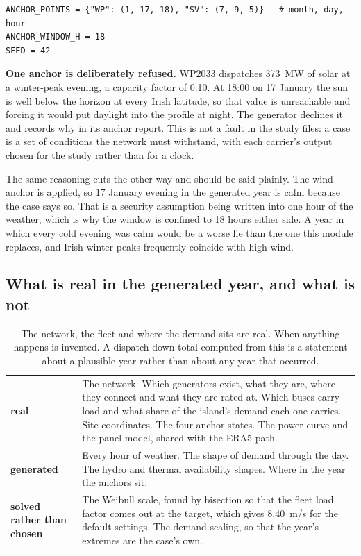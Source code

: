 \documentclass[11pt,a4paper]{article}
\begin{document}
\begin{lstlisting}
ANCHOR_POINTS = {"WP": (1, 17, 18), "SV": (7, 9, 5)}   # month, day, hour
ANCHOR_WINDOW_H = 18
SEED = 42
\end{lstlisting}

\textbf{One anchor is deliberately refused.} WP2033 dispatches 373~MW of solar
at a winter-peak evening, a capacity factor of 0.10. At 18:00 on 17 January the
sun is well below the horizon at every Irish latitude, so that value is
unreachable and forcing it would put daylight into the profile at night. The
generator declines it and records why in its anchor report. This is not a fault
in the study files: a case is a set of conditions the network must withstand,
with each carrier's output chosen for the study rather than for a clock.

The same reasoning cuts the other way and should be said plainly. The wind
anchor is applied, so 17 January evening in the generated year is calm because
the case says so. That is a security assumption being written into one hour of
the weather, which is why the window is confined to 18 hours either side.
A year in which every cold evening was calm would be a worse lie than the one
this module replaces, and Irish winter peaks frequently coincide with high
wind.

\subsection{What is real in the generated year, and what is not}

\begin{table}[H]\centering\small
\begin{tabularx}{\textwidth}{lX}
\toprule
\textbf{real} & The network. Which generators exist, what they are, where they
connect and what they are rated at. Which buses carry load and what share of
the island's demand each one carries. Site coordinates. The four anchor states.
The power curve and the panel model, shared with the ERA5 path. \\
\addlinespace
\textbf{generated} & Every hour of weather. The shape of demand through the
day. The hydro and thermal availability shapes. Where in the year the anchors
sit. \\
\addlinespace
\textbf{solved rather than chosen} & The Weibull scale, found by bisection so
that the fleet load factor comes out at the target, which gives 8.40~m/s for
the default settings. The demand scaling, so that the year's extremes are the
case's own. \\
\bottomrule
\end{tabularx}
\caption{The network, the fleet and where the demand sits are real. When
anything happens is invented. A dispatch-down total computed from this is a
statement about a plausible year rather than about any year that occurred.}
\end{table}
\end{document}
